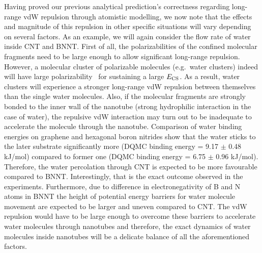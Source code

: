 \documentclass[aps,prl,groupaddress, twocolumn]{revtex4-1}  %
\begin{document}
Having proved our previous analytical prediction's correctness regarding long-range vdW repulsion through atomistic modelling, we now note that the effects and magnitude of this repulsion in other specific situations will vary depending on several factors. As an example, we will again consider the flow rate of water inside CNT and BNNT\@. First of all, the polarizabilities of the confined molecular fragments need to be large enough to allow significant long-range repulsion. However, a molecular cluster of polarizable molecules (e.g.\ water clusters) indeed will have large polarizability~\cite{hammond_2009} for sustaining a large $E_{\rm CS}$. As a result, water clusters will experience a stronger long-range vdW repulsion between themselves than the single water molecules. Also, if the molecular fragments are strongly bonded to the inner wall of the nanotube (strong hydrophilic interaction in the case of water), the repulsive vdW interaction may turn out to be inadequate to accelerate the molecule through the nanotube. Comparison of water binding energies on graphene and hexagonal boron nitrides show that the water sticks to the later substrate significantly more (DQMC binding energy = 9.17 $\pm$ 0.48 kJ/mol) compared to former one (DQMC binding energy = 6.75 $\pm$ 0.96 kJ/mol)\cite{Al-Hamdani_CNT_2017, Al-Hamdani_BNNT_2017}. Therefore, the water percolation through CNT is expected to be more favourable compared to BNNT\@. Interestingly, that is the exact outcome observed in the experiments\cite{secchi2016massive}. Furthermore, due to difference in electronegativity of B and N atoms in BNNT the height of potential energy barriers for water molecule movement are expected to be larger and uneven compared to CNT\@. The vdW repulsion would have to be large enough to overcome these barriers to accelerate water molecules through nanotubes and therefore, the exact dynamics of water molecules inside nanotubes will be a delicate balance of all the aforementioned factors.\\ 
\end{document}
